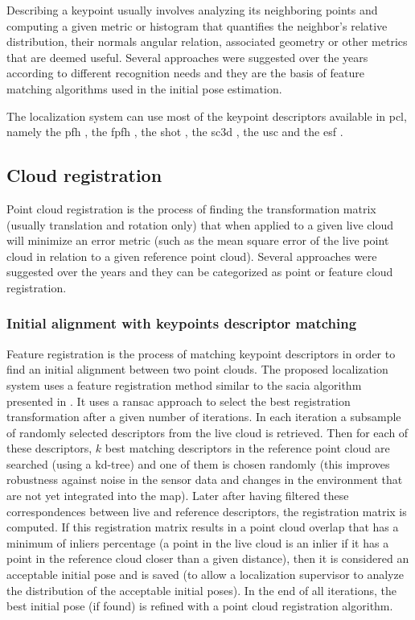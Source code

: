 Describing a keypoint usually involves analyzing its neighboring points and computing a given metric or histogram that quantifies the neighbor's relative distribution, their normals angular relation, associated geometry or other metrics that are deemed useful. Several approaches were suggested over the years according to different recognition needs and they are the basis of feature matching algorithms used in the initial pose estimation.

The localization system can use most of the keypoint descriptors available in \gls{pcl}, namely the \gls{pfh} \cite{Rusu2008a}, the \gls{fpfh} \cite{Rusu2009}, the \gls{shot} \cite{Tombari2011}, the \gls{sc3d} \cite{Frome2004}, the \gls{usc} \cite{Tombari2010} and the \gls{esf} \cite{Wohlkinger2011}.


\subsection{Cloud registration}

Point cloud registration is the process of finding the transformation matrix (usually translation and rotation only) that when applied to a given live cloud will minimize an error metric (such as the mean square error of the live point cloud in relation to a given reference point cloud). Several approaches were suggested over the years and they can be categorized as point or feature cloud registration.


\subsubsection{Initial alignment with keypoints descriptor matching}\label{subsec:localization-system_feature-registration}

Feature registration is the process of matching keypoint descriptors in order to find an initial alignment between two point clouds. The proposed localization system uses a feature registration method similar to the \gls{sacia} algorithm presented in \cite{Rusu2009}. It uses a \gls{ransac} approach to select the best registration transformation after a given number of iterations. In each iteration a subsample of randomly selected descriptors from the live cloud is retrieved. Then for each of these descriptors, $k$ best matching descriptors in the reference point cloud are searched (using a kd-tree) and one of them is chosen randomly (this improves robustness against noise in the sensor data and changes in the environment that are not yet integrated into the map). Later after having filtered these correspondences between live and reference descriptors, the registration matrix is computed. If this registration matrix results in a point cloud overlap that has a minimum of inliers percentage (a point in the live cloud is an inlier if it has a point in the reference cloud closer than a given distance), then it is considered an acceptable initial pose and is saved (to allow a localization supervisor to analyze the distribution of the acceptable initial poses). In the end of all iterations, the best initial pose (if found) is refined with a point cloud registration algorithm.


